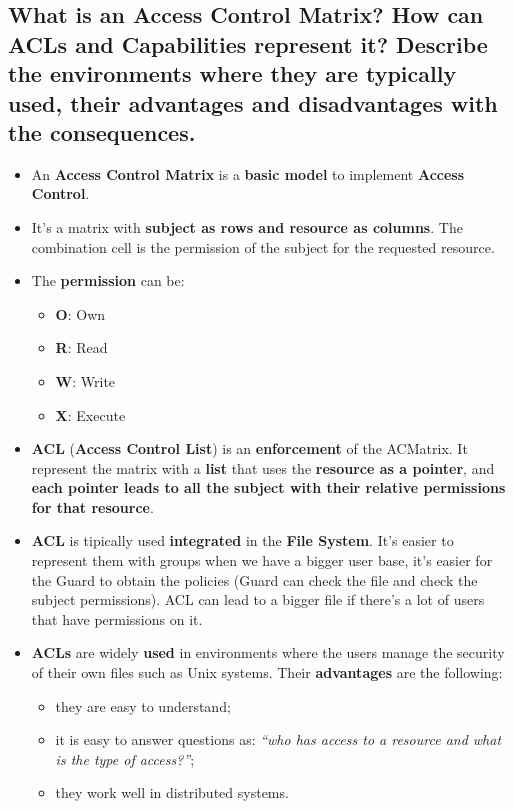 \documentclass[9pt, letterpaper]{article}
\begin{document}
\subsection{What is an Access Control Matrix? How can ACLs and Capabilities represent it? Describe the environments where they are typically used, their advantages and disadvantages with the consequences.}
\begin{itemize}
	\item An \textbf{Access Control Matrix} is a \textbf{basic model} to implement \textbf{Access Control}.
	\item It's a matrix with \textbf{subject as rows and resource as columns}. The combination cell is the permission of the subject for the requested resource.
	\item The \textbf{permission} can be:
	      \begin{itemize}
		      \item \textbf{O}: Own
		      \item \textbf{R}: Read
		      \item \textbf{W}: Write
		      \item \textbf{X}: Execute
	      \end{itemize}
	\item \textbf{ACL} (\textbf{Access Control List}) is an \textbf{enforcement} of the ACMatrix. It represent the matrix with a \textbf{list} that uses the \textbf{resource as a pointer}, and \textbf{each pointer leads to all the subject with their relative permissions for that resource}.
	\item \textbf{ACL} is tipically used \textbf{integrated} in the \textbf{File System}. It's easier to represent them with groups when we have a bigger user base, it's easier for the Guard to obtain the policies (Guard can check the file and check the subject permissions). ACL can lead to a bigger file if there's a lot of users that have permissions on it.
	\item \textbf{ACLs} are widely \textbf{used} in environments where the users manage the security of their own files such as Unix systems. Their \textbf{advantages} are the following:
	      \begin{itemize}
		      \item they are easy to understand;
		      \item it is easy to answer questions as: \textit{“who has access to a resource and what is the type of access?”};
		      \item they work well in distributed systems.

\end{itemize}
\end{itemize}
\end{document}
